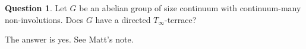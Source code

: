 \documentclass[11pt]{amsart}
\theoremstyle{definition}
\newtheorem{question}{Question}
\theoremstyle{remark}
\newcommand{\R}{\mathbb{R}}
\newcommand{\st}{\; | \;}
\newcommand{\set}[2]{\left\{#1\st #2 \right\}}
\newcommand{\To}{\longrightarrow}
\renewcommand{\a}{\textup{\textbf{a}}}
\begin{document}
\begin{question} Let $G$ be an abelian group of size continuum with continuum-many non-involutions. Does $G$ have a directed $T_\infty$-terrace? \end{question}

The answer is yes. See Matt's note.
%
%
%
\end{document}
